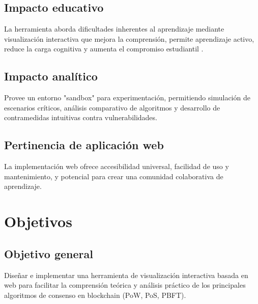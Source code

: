 \documentclass[spanish,12pt,letterpaper]{report}
\begin{document}
\subsection{Impacto educativo}
La herramienta aborda dificultades inherentes al aprendizaje mediante visualización interactiva que mejora la comprensión, permite aprendizaje activo, reduce la carga cognitiva y aumenta el compromiso estudiantil \parencite{researchgate2018towards, stanford2025rodger}.

\subsection{Impacto analítico}
Provee un entorno "sandbox" para experimentación, permitiendo simulación de escenarios críticos, análisis comparativo de algoritmos y desarrollo de contramedidas intuitivas contra vulnerabilidades.

\subsection{Pertinencia de aplicación web}
La implementación web ofrece accesibilidad universal, facilidad de uso y mantenimiento, y potencial para crear una comunidad colaborativa de aprendizaje.

\section{Objetivos}
\subsection{Objetivo general}
Diseñar e implementar una herramienta de visualización interactiva basada en web para facilitar la comprensión teórica y análisis práctico de los principales algoritmos de consenso en blockchain (PoW, PoS, PBFT).
\end{document}
